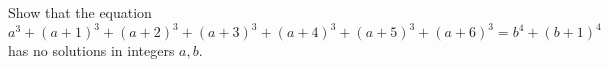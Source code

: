 Show that the equation
\[
a^3+(a+1)^3+(a+2)^3+(a+3)^3+(a+4)^3+(a+5)^3+(a+6)^3=b^4+(b+1)^4
\]
has no solutions in integers $a,b$.
